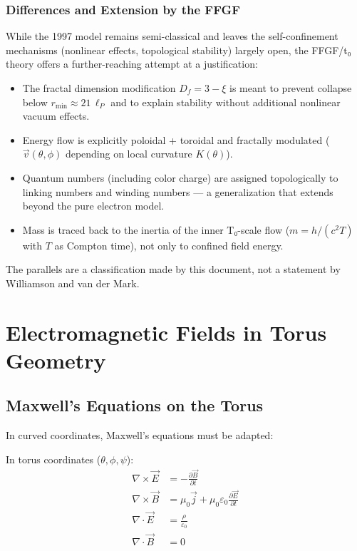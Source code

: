 \subsubsection{Differences and Extension by the FFGF}

While the 1997 model remains semi-classical and leaves the self-confinement mechanisms (nonlinear effects, topological stability) largely open, the FFGF/t₀ theory offers a further-reaching attempt at a justification:

\begin{itemize}
	\item The fractal dimension modification $D_f = 3 - \xi$ is meant to prevent collapse below $r_{\min} \approx 21\,\ell_P$ and to explain stability without additional nonlinear vacuum effects.
	\item Energy flow is explicitly poloidal + toroidal and fractally modulated ($\vec{v}(\theta,\phi)$ depending on local curvature $K(\theta)$).
	\item Quantum numbers (including color charge) are assigned topologically to linking numbers and winding numbers — a generalization that extends beyond the pure electron model.
	\item Mass is traced back to the inertia of the inner T₀-scale flow ($m = h/(c^2 T)$ with $T$ as Compton time), not only to confined field energy.
\end{itemize}

The parallels are a classification made by this document, not a statement by Williamson and van der Mark.

\section{Electromagnetic Fields in Torus Geometry}
\subsection{Maxwell's Equations on the Torus}
In curved coordinates, Maxwell's equations must be adapted:

In torus coordinates (\( \theta, \phi, \psi \)):
\begin{align}
	\nabla \times \vec{E} &= -\frac{\partial \vec{B}}{\partial t} \\
	\nabla \times \vec{B} &= \mu_0 \vec{j} + \mu_0 \varepsilon_0 \frac{\partial \vec{E}}{\partial t} \\
	\nabla \cdot \vec{E} &= \frac{\rho}{\varepsilon_0} \\
	\nabla \cdot \vec{B} &= 0
\end{align}

